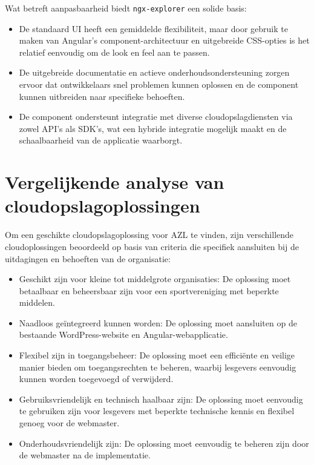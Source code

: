 Wat betreft aanpasbaarheid biedt \texttt{ngx-explorer} een solide basis:
\begin{itemize}
  \item De standaard UI heeft een gemiddelde flexibiliteit, maar door gebruik te maken van Angular's component-architectuur en uitgebreide CSS-opties is het relatief eenvoudig om de look en feel aan te passen.
  \item De uitgebreide documentatie en actieve onderhoudsondersteuning zorgen ervoor dat ontwikkelaars snel problemen kunnen oplossen en de component kunnen uitbreiden naar specifieke behoeften.
  \item De component ondersteunt integratie met diverse cloudopslagdiensten via zowel API's als SDK's, wat een hybride integratie mogelijk maakt en de schaalbaarheid van de applicatie waarborgt.
\end{itemize}



\section{Vergelijkende analyse van cloudopslagoplossingen}
Om een geschikte cloudopslagoplossing voor AZL te vinden, zijn verschillende cloudoplossingen beoordeeld op basis van criteria die specifiek aansluiten bij de uitdagingen en behoeften van de organisatie:
\begin{itemize}
    \item Geschikt zijn voor kleine tot middelgrote organisaties: De oplossing moet betaalbaar en beheersbaar zijn voor een sportvereniging met beperkte middelen.
    \item Naadloos geïntegreerd kunnen worden: De oplossing moet aansluiten op de bestaande WordPress-website en Angular-webapplicatie.
    \item Flexibel zijn in toegangsbeheer: De oplossing moet een efficiënte en veilige manier bieden om toegangsrechten te beheren, waarbij lesgevers eenvoudig kunnen worden toegevoegd of verwijderd.
    \item Gebruiksvriendelijk en technisch haalbaar zijn: De oplossing moet eenvoudig te gebruiken zijn voor lesgevers met beperkte technische kennis en flexibel genoeg voor de webmaster.
    \item Onderhoudsvriendelijk zijn: De oplossing moet eenvoudig te beheren zijn door de webmaster na de implementatie.
\end{itemize}

